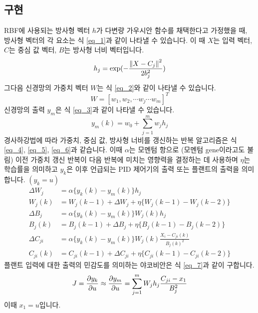 \subsection{구현}
RBF에 사용되는 방사형 벡터 \(h\)가 다변량 가우시안 함수를 채택한다고 가정했을 때, 방사형 벡터의 각 요소는 식 \ref{eq_1}과 같이 나타낼 수 있습니다. \cite{1563016} 이 때  \(X\)는 입력 벡터, \(C\)는 중심 값 벡터, \(B\)는 방사형 너비 벡터입니다.
%
\begin{equation} \label{eq_1}
h_{j}=\exp(-{\left\Vert X-C_{j}\right\Vert^{2}\over 2b_{j}^{2}})
\end{equation}
%
그다음 신경망의 가중치 벡터 \(W\)는 식 \ref{eq_2}와 같이 나타낼 수 있습니다.
\begin{equation} \label{eq_2}
W=[w_{1},w_{2},\cdots w_{j}\cdots w_{m}]^{T} 
\end{equation}
%
신경망의 출력 \(y_m\)은 식 \ref{eq_3}과 같이 나타낼 수 있습니다.
%
\begin{equation} \label{eq_3}
y_{m}(k)=w_{0}+\sum\limits_{j=1}^{m}w_{j}h_{j} 
\end{equation}
%
경사하강법에 따라 가중치, 중심 값, 방사형 너비를 갱신하는 반복 알고리즘은 식 \ref{eq_4}, \ref{eq_5}, \ref{eq_6}과 같습니다. 이때 \(\alpha\)는 모멘텀 항으로 (모멘텀 gene이라고도 불림) 이전 가중치 갱신 반복이 다음 반복에 미치는 영향력을 결정하는 데 사용하며 \cite{Markopoulos2016-il} \(\eta\)는 학습률을 의미하고 \(y_{k}\)은 이후 언급되는 PID 제어기의 출력 또는 플랜트의 출력을 의미합니다. \((y_{k}=u)\)
%
\begin{align} 
\Delta W_{j} &=\alpha \{y_{k}(k)-y_{m}(k)\}h_{j} \\
\label{eq_4}
W_{j}(k) &=W_{j}(k-1)+\Delta W_{j}+\eta \{ W_{j}(k-1)-W_{j}(k-2) \} \\
\Delta B_{j} &=\alpha \{y_{k}(k)-y_{m}(k)\} W_{j}(k)h_{j} \\
\label{eq_5}
B_{j}(k) &= B_{j}(k-1)+\Delta B_{j} + \eta \{ B_{j}(k-1)-B_{j}(k-2) \} \\
\Delta C_{ji} &= \alpha \{ y_{k}(k)-y_{m}(k)\} W_{j}(k) \frac{X_{i}-C_{ji}(k)}{B_{j}(k)^2} \\
\label{eq_6}
C_{ji}(k) &= C_{ji}(k-1) + \Delta C_{ji} + \eta \{ C_{ji}(k-1)-C_{ji}(k-2) \}
\end{align} 
%
플랜트 입력에 대한 출력의 민감도를 의미하는 야코비안은 식 \ref{eq_7}과 같이 구합니다.
%
\begin{equation} \label{eq_7}
J = {\partial y_{k}\over \partial u}\approx{\partial y_{m}\over \partial u}
=\sum\limits_{j=1}^{m}W_{j}h_{j}{C_{ji}-x_{1}\over B_{j}^{2}}
\end{equation}
%
이때 \(x_{1}=u\)입니다.
%